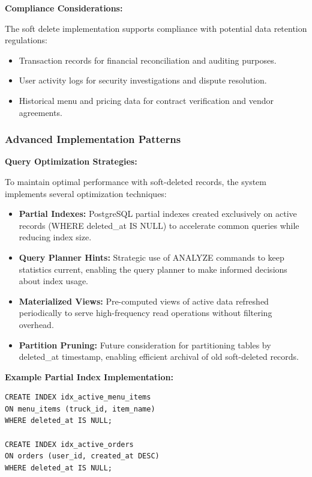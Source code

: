 \documentclass[12pt,a4paper]{article}
\begin{document}
\vspace{0.5em}

\textbf{Compliance Considerations:}

The soft delete implementation supports compliance with potential data retention regulations:

\begin{itemize}[leftmargin=2em, itemsep=6pt]
    \item Transaction records for financial reconciliation and auditing purposes.
    \item User activity logs for security investigations and dispute resolution.
    \item Historical menu and pricing data for contract verification and vendor agreements.
\end{itemize}

\subsubsection{Advanced Implementation Patterns}

\textbf{Query Optimization Strategies:}

To maintain optimal performance with soft-deleted records, the system implements several optimization techniques:

\begin{itemize}[leftmargin=2em, itemsep=6pt]
    \item \textbf{Partial Indexes:} PostgreSQL partial indexes created exclusively on active records (WHERE deleted\_at IS NULL) to accelerate common queries while reducing index size.
    \item \textbf{Query Planner Hints:} Strategic use of ANALYZE commands to keep statistics current, enabling the query planner to make informed decisions about index usage.
    \item \textbf{Materialized Views:} Pre-computed views of active data refreshed periodically to serve high-frequency read operations without filtering overhead.
    \item \textbf{Partition Pruning:} Future consideration for partitioning tables by deleted\_at timestamp, enabling efficient archival of old soft-deleted records.
\end{itemize}

\vspace{0.5em}

\textbf{Example Partial Index Implementation:}

\begin{verbatim}
CREATE INDEX idx_active_menu_items 
ON menu_items (truck_id, item_name) 
WHERE deleted_at IS NULL;

CREATE INDEX idx_active_orders 
ON orders (user_id, created_at DESC) 
WHERE deleted_at IS NULL;
\end{verbatim}
\end{document}
